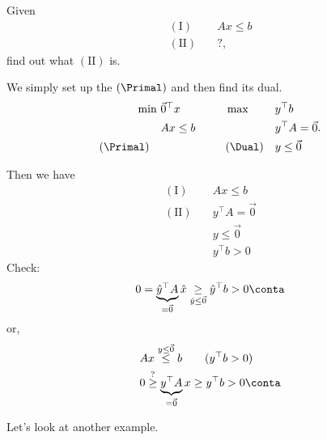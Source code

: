 \begin{eg}
	Given
	\[
		\begin{aligned}
			(\mathrm{I})\quad  & Ax\leq b \\
			(\mathrm{II})\quad & ?,
		\end{aligned}
	\]
	find out what \((\mathrm{II})\) is.
\end{eg}
\begin{explanation}
	We simply set up the \((\Primal)\) and then find its dual.
	\[
		\begin{alignedat}{5}
			\min~          & \vec{0}^{\top} x\qquad\qquad &  & \max ~       &  & y^{\top}b           \\
			               & Ax \leq b                    &  &              &  & y^{\top} A =\vec{0} \\
			(\Primal)\quad &                              &  & (\Dual)\quad &  & y\leq \vec{0}
		\end{alignedat}.
	\]

	Then we have
	\[
		\begin{aligned}
			(\mathrm{I})\quad  & Ax\leq b            \\
			(\mathrm{II})\quad & y^{\top}A = \vec{0} \\
			                   & y\leq \vec{0}       \\
			                   & y^{\top} b>0
		\end{aligned}
	\]
	Check\(\colon\)
	\[
		0 = \underbrace{\hat{y}^{\top} A}_{=\vec{0}} \hat{x} \underset{\hat{y} \leq \vec{0}}{\geq}  \hat{y}^{\top} b>0 \conta
	\]
	or,
	\[
		\begin{split}
			 & Ax \overset{y\leq \vec{0}}{\leq} b\qquad (y^{\top}b>0)                          \\
			 & 0 \overset{?}{\geq} \underbrace{y^{\top}A}_{ = \vec{0}} x\geq y^{\top}b>0\conta
		\end{split}
	\]
\end{explanation}

Let's look at another example.

